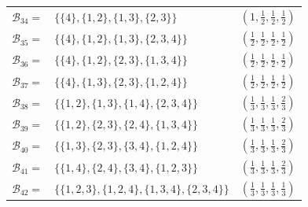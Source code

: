 \documentclass[10pt,a4paper,titlepage]{article}
\theoremstyle{plain}
\theoremstyle{definition}
\begin{document}
\begin{center}
\begin{tabular}{ | r l | c | }
    $\mathcal{B}_{34} =$ & $\{\{4\}, \{1,2\}, \{1,3\}, \{2,3\}\}$ & $\left(1, \frac{1}{2}, \frac{1}{2}, \frac{1}{2}\right)$\\[2pt]
    $\mathcal{B}_{35} =$ & $\{\{4\}, \{1,2\}, \{1,3\}, \{2,3,4\}\}$ & $\left(\frac{1}{2}, \frac{1}{2}, \frac{1}{2}, \frac{1}{2}\right)$\\[2pt]
    $\mathcal{B}_{36} =$ & $\{\{4\}, \{1,2\}, \{2,3\}, \{1,3,4\}\}$ & $\left(\frac{1}{2}, \frac{1}{2}, \frac{1}{2}, \frac{1}{2}\right)$\\[2pt]
    $\mathcal{B}_{37} =$ & $\{\{4\}, \{1,3\}, \{2,3\}, \{1,2,4\}\}$ & $\left(\frac{1}{2}, \frac{1}{2}, \frac{1}{2}, \frac{1}{2}\right)$\\[2pt]
    $\mathcal{B}_{38} =$ & $\{\{1,2\}, \{1,3\}, \{1,4\}, \{2,3,4\}\}$ & $\left(\frac{1}{3}, \frac{1}{3}, \frac{1}{3}, \frac{2}{3}\right)$\\[2pt]
    $\mathcal{B}_{39} =$ & $\{\{1,2\}, \{2,3\}, \{2,4\}, \{1,3,4\}\}$ & $\left(\frac{1}{3}, \frac{1}{3}, \frac{1}{3}, \frac{2}{3}\right)$\\[2pt]
    $\mathcal{B}_{40} =$ & $\{\{1,3\}, \{2,3\}, \{3,4\}, \{1,2,4\}\}$ & $\left(\frac{1}{3}, \frac{1}{3}, \frac{1}{3}, \frac{2}{3}\right)$\\[2pt]
    $\mathcal{B}_{41} =$ & $\{\{1,4\}, \{2,4\}, \{3,4\}, \{1,2,3\}\}$ & $\left(\frac{1}{3}, \frac{1}{3}, \frac{1}{3}, \frac{2}{3}\right)$\\[2pt]
    $\mathcal{B}_{42} =$ & $\{\{1,2,3\}, \{1,2,4\}, \{1,3,4\}, \{2,3,4\}\}$ & $\left(\frac{1}{3}, \frac{1}{3}, \frac{1}{3}, \frac{1}{3}\right)$\\[2pt]
    \hline
\end{tabular}
    
\end{center}
 
\printbibliography
\end{document}
